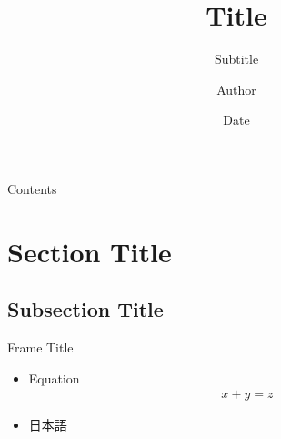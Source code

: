 \documentclass{beamer}
\title[ShortTitle]{Title}
\subtitle[ShortSubtitle]{Subtitle}
\author[ShortAuthor]{Author}
\institute{Institute}
\date{Date}
\begin{document}
\begin{frame}[plain]
    \titleHeaderLogo
    \titlepage
\end{frame}

\begin{frame}{Contents}
    \tableofcontents[hideallsubsections]
\end{frame}

\section{Section Title}

\subsection{Subsection Title}

\begin{frame}{Frame Title}
\begin{itemize}
    \item Equation
    \begin{align}
        x+y=z
    \end{align}
    \item 日本語
\end{itemize}
\end{frame}
\end{document}

